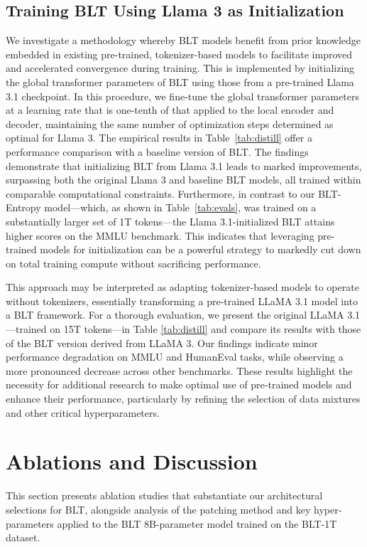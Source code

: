 \subsection{Training {\textsc BLT} Using Llama 3 as Initialization}
\label{sec:distillation}
We investigate a methodology whereby {\textsc BLT} models benefit from prior knowledge embedded in existing pre-trained, tokenizer-based models to facilitate improved and accelerated convergence during training. This is implemented by initializing the global transformer parameters of {\textsc BLT} using those from a pre-trained Llama 3.1 checkpoint. In this procedure, we fine-tune the global transformer parameters at a learning rate that is one-tenth of that applied to the local encoder and decoder, maintaining the same number of optimization steps determined as optimal for Llama 3. The empirical results in Table~\ref{tab:distill} offer a performance comparison with a baseline version of {\textsc BLT}. The findings demonstrate that initializing {\textsc BLT} from Llama 3.1 leads to marked improvements, surpassing both the original Llama 3 and baseline {\textsc BLT} models, all trained within comparable computational constraints. Furthermore, in contrast to our {\textsc BLT}-Entropy model—which, as shown in Table~\ref{tab:evals}, was trained on a substantially larger set of 1T tokens—the Llama 3.1-initialized {\textsc BLT} attains higher scores on the MMLU benchmark. This indicates that leveraging pre-trained models for initialization can be a powerful strategy to markedly cut down on total training compute without sacrificing performance.

This approach may be interpreted as adapting tokenizer-based models to operate without tokenizers, essentially transforming a pre-trained LLaMA 3.1 model into a {\textsc BLT} framework. For a thorough evaluation, we present the original LLaMA 3.1—trained on 15T tokens—in Table \ref{tab:distill} and compare its results with those of the {\textsc BLT} version derived from LLaMA 3. Our findings indicate minor performance degradation on MMLU and HumanEval tasks, while observing a more pronounced decrease across other benchmarks. These results highlight the necessity for additional research to make optimal use of pre-trained models and enhance their performance, particularly by refining the selection of data mixtures and other critical hyperparameters.

\section{Ablations and Discussion}
\label{section:ablations}
This section presents ablation studies that substantiate our architectural selections for {\textsc BLT}, alongside analysis of the patching method and key hyper-parameters applied to the {\textsc BLT} 8B-parameter model trained on the {\textsc BLT}-1T dataset.

